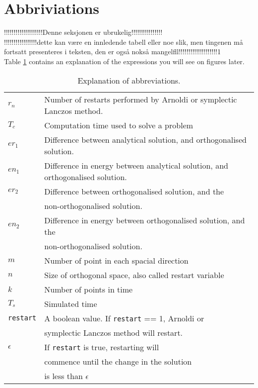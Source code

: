 \section{Abbriviations}%
!!!!!!!!!!!!!!!!!!!!Denne seksjonen er ubrukelig!!!!!!!!!!!!!!!!\\
!!!!!!!!!!!!!!!!!dette kan være en innledende tabell eller noe slik, men tingenen må fortsatt presenteres i teksten, den er også nokså mangelfll!!!!!!!!!!!!!!!!!!!!1\\

Table \ref{tab:labels} contains an explanation of the expressions you will see on figures later.

\begin{table}[h]
\centering
\begin{tabular}{l| l}
$r_n$	& Number of restarts performed by Arnoldi or symplectic Lanczos method.  \\
$T_c$	& Computation time used to solve a problem \\
$er_1$ 	& Difference between analytical solution, and orthogonalised solution. \\
$en_1$ 	& Difference in energy between analytical solution, and orthogonalised solution. \\
$er_2$ 	& Difference between orthogonalised solution, and the\\& non-orthogonalised solution. \\
$en_2$ 	& Difference in energy between orthogonalised solution, and the\\& non-orthogonalised solution. \\
$m$ 		& Number of point in each spacial direction \\
$n$ 		& Size of orthogonal space, also called restart variable \\
$k$ 		& Number of points in time \\
$T_s$ 	& Simulated time \\
\texttt{restart}& A boolean value. If \texttt{restart} == 1, Arnoldi or \\&symplectic Lanczos method will restart. \\
$\epsilon$ & If \texttt{restart} is true, restarting will\\& commence until the change in the solution\\& is less than $\epsilon$ \\
\end{tabular}
\caption{ Explanation of abbreviations. }
\label{tab:labels}
\end{table}


